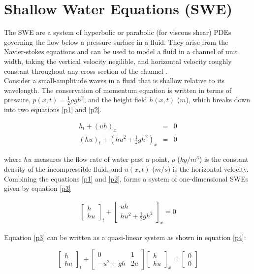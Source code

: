 \documentclass[12pt,a4paper]{article}
\begin{document}
	
	\section{Shallow Water Equations (SWE)}
	The SWE are a system of hyperbolic or parabolic (for viscous shear) PDEs governing the flow below a pressure surface in a fluid. They arise from the Navier-stokes equations and can be used to model a fluid in a channel of unit width, taking the vertical velocity negilible, and horizontal velocity roughly constant throughout any cross section of the channel \cite{ge:2008}.  \\
	
	\noindent Consider a small-amplitude waves in a fluid that is shallow relative to its wavelength. The conservation of momentum equation is written in terms of pressure, $p(x,t) = \frac{1}{2}\rho gh^{2}$, and the height field $h(x,t)$ ($m$), which breaks down into two equations \eqref{p1} and \eqref{p2}.

	\begin{eqnarray}
		h_{t} + (uh)_x &=& 0
		\label{p1} \\
		(hu)_t + \left(hu^{2} + \frac{1}{2}gh^{2} \right)_x &=& 0
		\label{p2}
	\end{eqnarray}
	
	\noindent where $hu$ measures the flow rate of water past a point,  $\rho$ ($kg/m^3$) is the constant density of the incompressible fluid, and $u(x,t)$ ($m/s$) is the horizontal velocity.\\
	
	\noindent	Combining the equations \eqref{p1} and \eqref{p2}, forms a system of one-dimensional SWEs given by equation \eqref{p3}
	
	\begin{eqnarray}
		\begin{bmatrix} h \\ hu \end{bmatrix}_t + \begin{bmatrix} uh \\ hu^{2} + \frac{1}{2} gh^{2} \end{bmatrix}_x  = 0 
		\label{p3}
	\end{eqnarray}
	
	\noindent Equation \eqref{p3} can be written as a quasi-linear system as shown in equation \eqref{p4}:
	
	\begin{equation}
		\begin{bmatrix} h \\ hu \end{bmatrix}_t + 
		\begin{bmatrix} 0 &  1 \\ -u^{2} + gh & 2u \end{bmatrix} 
		\begin{bmatrix} h \\ hu \end{bmatrix}_x =  
		\begin{bmatrix} 0 \\ 0 \end{bmatrix}
		\label{p4}
	\end{equation}
	
\end{document}
